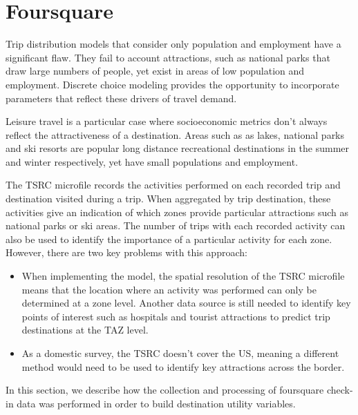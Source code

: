 \section{Foursquare}
\label{section:data-foursquare}
\label{section:foursquare}
Trip distribution models that consider only population and employment have a significant flaw. They fail to account attractions, such as national parks that draw large numbers of people, yet exist in areas of low population and employment. Discrete choice modeling provides the opportunity to incorporate parameters that reflect these drivers of travel demand. 
	
Leisure travel is a particular case where socioeconomic metrics don't always reflect the attractiveness of a destination. Areas such as as lakes, national parks and ski resorts are popular long distance recreational destinations in the summer and winter respectively, yet have small populations and employment. 
	
The TSRC microfile records the activities performed on each recorded trip and destination visited during a trip. When aggregated by trip destination, these activities give an indication of which zones provide particular attractions such as national parks or ski areas. The number of trips with each recorded activity can also be used to identify the importance of a particular activity for each zone. However, there are two key problems with this approach:

\begin{itemize}
\item When implementing the model, the spatial resolution of the TSRC microfile means that the location where an activity was performed can only be determined at a zone level. Another data source is still needed to identify key points of interest such as hospitals and tourist attractions to predict trip destinations at the TAZ level.
\item As a domestic survey, the TSRC doesn't cover the US, meaning a different method would need to be used to identify key attractions across the border.
\end{itemize}	
In this section, we describe how the collection and processing of foursquare check-in data was performed in order to build destination utility variables.

